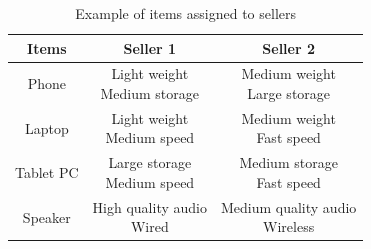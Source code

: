\begin{table}[h]
	\centering
	
	\begin{tabular}{ c| c | c  }
		\hline	
		Items & Seller 1  &  Seller 2\\
		\hline	
		\hline	
		Phone &  \makecell{Light weight \\ Medium storage}    & \makecell{Medium weight\\ Large storage}\\
		\hline			
		Laptop &  \makecell{Light weight \\ Medium speed}    & \makecell{Medium weight\\ Fast speed}\\
		\hline			
		Tablet PC &  \makecell{Large storage\\ Medium speed}    & \makecell{Medium storage\\ Fast speed}\\
		\hline	
		Speaker &  \makecell{High quality audio\\ Wired}    & \makecell{Medium quality audio\\ Wireless}\\
		\hline	
	\end{tabular}
	\caption{Example of items assigned to sellers}
	\label{table:haggling_items}
\end{table}


